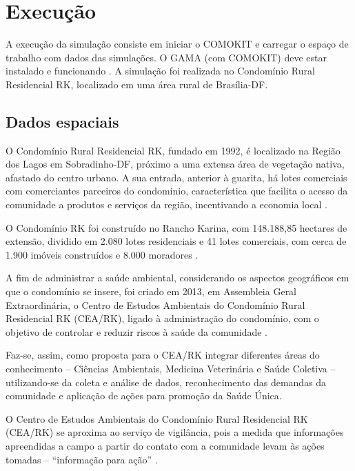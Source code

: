 \section{Execução}

A execução da simulação consiste em iniciar o COMOKIT e carregar o espaço de trabalho com dados das simulações. O GAMA (com COMOKIT) deve estar instalado e funcionando \cite{ComokitDoc}. A simulação foi realizada no Condomínio Rural Residencial RK, localizado em uma área rural de Brasília-DF.


\subsection{Dados espaciais}

O Condomínio Rural Residencial RK, fundado em 1992, é localizado na Região dos Lagos em Sobradinho-DF, próximo a uma extensa área de vegetação nativa, afastado do centro urbano. A sua entrada, anterior à guarita, há lotes comerciais com comerciantes parceiros do condomínio, característica que facilita o acesso da comunidade a produtos e serviços da região, incentivando a economia local \cite{CondominioRK:online}.

O Condomínio RK foi construído no Rancho Karina, com 148.188,85 hectares de extensão, dividido em 2.080 lotes residenciais e 41 lotes comerciais, com cerca de 1.900 imóveis construídos e 8.000 moradores \cite{CondominioRK:online}.

A fim de administrar a saúde ambiental, considerando os aspectos geográficos em que o condomínio se insere, foi criado em 2013, em Assembleia Geral Extraordinária, o Centro de Estudos Ambientais do Condomínio Rural Residencial RK (CEA/RK), ligado à administração do condomínio, com o objetivo de controlar e reduzir riscos à saúde da comunidade \cite{CondominioRK:online}.

Faz-se, assim, como proposta para o CEA/RK integrar diferentes áreas do
conhecimento – Ciências Ambientais, Medicina Veterinária e Saúde Coletiva –
utilizando-se da coleta e análise de dados, reconhecimento das demandas da
comunidade e aplicação de ações para promoção da Saúde Única. \cite{miranda2020acompanhamento}

O Centro de Estudos Ambientais do Condomínio Rural Residencial RK (CEA/RK) se aproxima ao serviço de vigilância, pois a medida que informações apreendidas a campo a partir do contato com a comunidade levam às ações tomadas – “informação para ação” \cite{wunsch1993sistema}.

